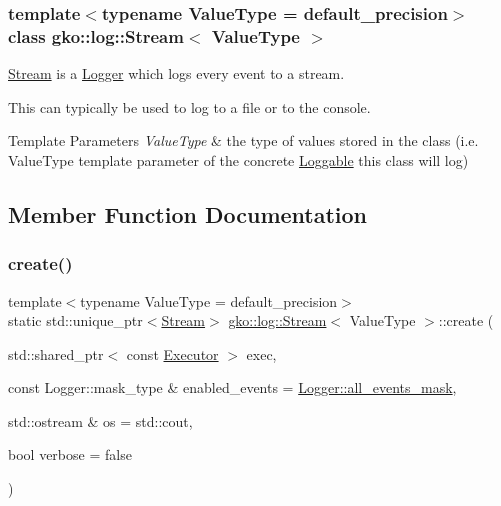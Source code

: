 \subsubsection*{template$<$typename Value\+Type = default\+\_\+precision$>$\newline
class gko\+::log\+::\+Stream$<$ Value\+Type $>$}

\hyperlink{classgko_1_1log_1_1Stream}{Stream} is a \hyperlink{classgko_1_1log_1_1Logger}{Logger} which logs every event to a stream. 

This can typically be used to log to a file or to the console.


\begin{DoxyTemplParams}{Template Parameters}
{\em Value\+Type} & the type of values stored in the class (i.\+e. Value\+Type template parameter of the concrete \hyperlink{classgko_1_1log_1_1Loggable}{Loggable} this class will log) \\
\hline
\end{DoxyTemplParams}


\subsection{Member Function Documentation}
\mbox{\label{classgko_1_1log_1_1Stream_a71f96d3f1cd7c03875476cd8db98145b}} 
\subsubsection{\texorpdfstring{create()}{create()}}
{\footnotesize\ttfamily template$<$typename Value\+Type  = default\+\_\+precision$>$ \\
static std\+::unique\+\_\+ptr$<$\hyperlink{classgko_1_1log_1_1Stream}{Stream}$>$ \hyperlink{classgko_1_1log_1_1Stream}{gko\+::log\+::\+Stream}$<$ Value\+Type $>$\+::create (\begin{DoxyParamCaption}\item[{std\+::shared\+\_\+ptr$<$ const \hyperlink{classgko_1_1Executor}{Executor} $>$}]{exec,  }\item[{const Logger\+::mask\+\_\+type \&}]{enabled\+\_\+events = {\ttfamily \hyperlink{classgko_1_1log_1_1Logger_a02534863a2d2f92dfeb2c39038365532}{Logger\+::all\+\_\+events\+\_\+mask}},  }\item[{std\+::ostream \&}]{os = {\ttfamily std\+:\+:cout},  }\item[{bool}]{verbose = {\ttfamily false} }\end{DoxyParamCaption})\hspace{0.3cm}{\ttfamily [static]}}



